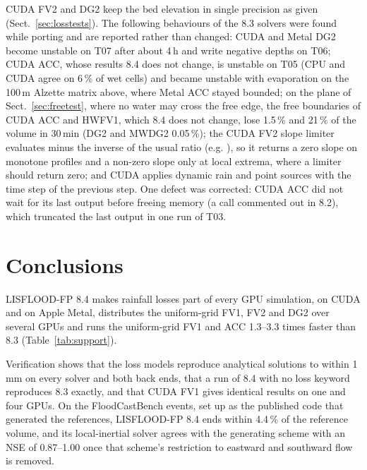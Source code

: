 \documentclass[preprint,12pt,authoryear]{elsarticle}
\begin{document}
CUDA FV2 and DG2 keep the bed elevation in single precision as given
(Sect.~\ref{sec:losstests}). The following behaviours of the 8.3 solvers were
found while porting and are reported rather than changed: CUDA and Metal DG2
become unstable on T07 after about 4\,h and write negative depths on T06;
CUDA ACC, whose results 8.4 does not change, is unstable on T05 (CPU and CUDA
agree on 6\,\% of wet cells) and became unstable with evaporation on the
100\,m Alzette matrix above, where Metal ACC stayed bounded; on the plane of
Sect.~\ref{sec:freetest}, where no water may cross the free edge, the free
boundaries of CUDA ACC and HWFV1, which 8.4 does not change, lose 1.5\,\% and
21\,\% of the volume in 30\,min (DG2 and MWDG2 0.05\,\%); the CUDA FV2
slope limiter evaluates minus the inverse of the usual ratio (e.g.
\citealp{Ayog2021}), so it returns a zero slope on
monotone profiles and a non-zero slope only at local extrema, where a limiter
should return zero; and CUDA applies dynamic rain
and point sources with the time step of the previous step. One defect was
corrected: CUDA ACC did not wait for its last output before freeing memory (a
call commented out in 8.2), which truncated the last output in one run of
T03.

\section{Conclusions}\label{sec:conclusions}

LISFLOOD-FP 8.4 makes rainfall losses part of every GPU simulation, on CUDA
and on Apple Metal, distributes the uniform-grid FV1, FV2 and DG2 over
several GPUs and runs the uniform-grid FV1 and ACC 1.3--3.3 times faster
than 8.3 (Table~\ref{tab:support}).

Verification shows that the loss models reproduce analytical solutions to
within 1\,mm on every solver and both back ends, that a run of 8.4 with no
loss keyword reproduces 8.3 exactly, and that CUDA FV1 gives identical results on one and four
GPUs. On the
FloodCastBench events, set up as the published code that generated the
references, LISFLOOD-FP 8.4 ends within 4.4\,\% of the reference volume, and
its local-inertial solver agrees with the generating scheme with an NSE of
0.87--1.00 once that scheme's restriction to eastward and southward flow is
removed.
\end{document}
